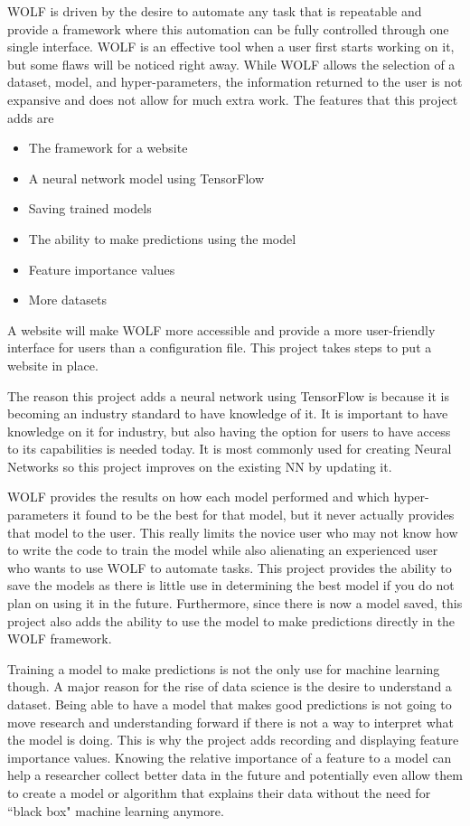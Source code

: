 WOLF is driven by the desire to automate any task that is repeatable and provide a framework where this automation can be fully controlled through one single interface. WOLF is an effective tool when a user first starts working on it, but some flaws will be noticed right away. While WOLF allows the selection of a dataset, model, and hyper-parameters, the information returned to the user is not expansive and does not allow for much extra work. The features that this project adds are
\begin{itemize}
	\item The framework for a website
	\item A neural network model using TensorFlow
	\item Saving trained models
	\item The ability to make predictions using the model
	\item Feature importance values
	\item More datasets
\end{itemize}

A website will make WOLF more accessible and provide a more user-friendly interface for users than a configuration file. This project takes steps to put a website in place.

The reason this project adds a neural network using TensorFlow is because it is becoming an industry standard to have knowledge of it. It is important to have knowledge on it for industry, but also having the option for users to have access to its capabilities is needed today. It is most commonly used for creating Neural Networks so this project improves on the existing NN by updating it.

WOLF provides the results on how each model performed and which hyper-parameters it found to be the best for that model, but it never actually provides that model to the user. This really limits the novice user who may not know how to write the code to train the model while also alienating an experienced user who wants to use WOLF to automate tasks. This project provides the ability to save the models as there is little use in determining the best model if you do not plan on using it in the future. Furthermore, since there is now a model saved, this project also adds the ability to use the model to make predictions directly in the WOLF framework.

Training a model to make predictions is not the only use for machine learning though. A major reason for the rise of data science is the desire to understand a dataset. Being able to have a model that makes good predictions is not going to move research and understanding forward if there is not a way to interpret what the model is doing. This is why the project adds recording and displaying feature importance values. Knowing the relative importance of a feature to a model can help a researcher collect better data in the future and potentially even allow them to create a model or algorithm that explains their data without the need for ``black box" machine learning anymore.

